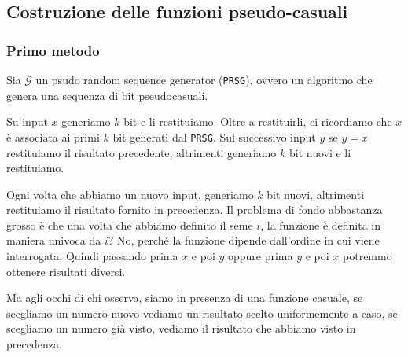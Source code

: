 \subsection{Costruzione delle funzioni pseudo-casuali}
\subsubsection{Primo metodo}
Sia $\mathcal{G}$ un psudo random sequence generator (\texttt{PRSG}), ovvero un algoritmo che
genera una sequenza di bit pseudocasuali.
\begin{figure}[H]
    \centering
  \end{figure}
Su input $x$ generiamo $k$ bit e li restituiamo. Oltre a restituirli, ci ricordiamo che $x$ è 
associata ai primi $k$ bit generati dal \texttt{PRSG}. Sul successivo input $y$ se $y = x$
restituiamo il risultato precedente, altrimenti generiamo $k$ bit nuovi e li restituiamo.

Ogni volta che abbiamo un nuovo input, generiamo $k$ bit nuovi, altrimenti restituiamo il risultato
fornito in precedenza. 
Il problema di fondo abbastanza grosso è che una volta che abbiamo definito il seme $i$, 
la funzione è definita in maniera univoca da $i$? No, perché la funzione dipende dall'ordine 
in cui viene interrogata. Quindi passando prima $x$ e poi $y$ oppure prima $y$ e poi $x$
potremmo ottenere risultati diversi.

Ma agli occhi di chi osserva, siamo in presenza di una funzione casuale, se scegliamo un numero 
nuovo vediamo un risultato scelto uniformemente a caso, se scegliamo un numero già visto,
vediamo il risultato che abbiamo visto in precedenza.


